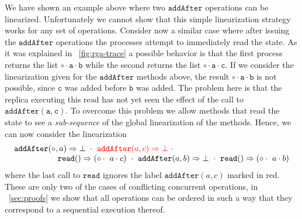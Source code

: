 We have shown an example above where two $\mathtt{addAfter}$
operations can be linearized.
%
Unfortunately we cannot show that this simple linearization strategy
works for any set of operations.
%
Consider now a similar case where after issuing the
$\mathtt{addAfter}$ operations the processes attempt to immediately
read the state.
%
As it was explained in \figureautorefname~\ref{fig:rga-trace} a possible behavior is
that the first process returns the list $\mathtt{\circ \cdot a \cdot
  b}$ while the second returns the list $\mathtt{\circ \cdot a \cdot
  c}$. 
%
If we consider the linearization given for the $\mathtt{addAfter}$
methods above, the result $\mathtt{\circ \cdot a \cdot b}$ is not
possible, since $\mathtt{c}$ was added before $\mathtt{b}$ was added.
%
The problem here is that the replica executing this read has not yet
seen the effect of the call to $\mathtt{addAfter(a, c)}$.
%
To overcome this problem we allow methods that read the state to see a
\emph{sub-sequence} of the global linearization of the methods.
%
Hence, we can now consider the linearization 
\[
  \begin{array}{c}
    \alabellong[\mathtt{addAfter}]{\circ,a}{\bot}\ \cdot\
    {\color{red} \alabellong[\mathtt{addAfter}]{a,c}{\bot}}\ \cdot \kern5cm\\    
    \hspace{\fill} \alabellong[\mathtt{read}]{}{(\circ \cdot\ a \cdot c)}\ \cdot\
    \alabellong[\mathtt{addAfter}]{a,b}{\bot}\ \cdot\
    \alabellong[\mathtt{read}]{}{(\circ \cdot\ a \cdot b)}
  \end{array}
\]
where the last call to $\mathtt{read}$ ignores the label
{\color{red} $\mathtt{addAfter}(a, c)$} marked in red.
%
These are only two of the cases of conflicting concurrent
operations, in \sectionautorefname~\ref{sec:proofs} we show that all operations
can be ordered in such a way that they correspond to a sequential
execution thereof.


